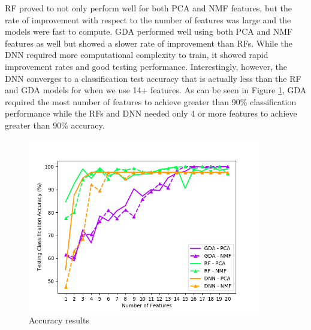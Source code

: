 \documentclass{article}[12pt]
\begin{document}
   RF proved to not only perform well for both PCA and NMF features, but the rate of improvement with respect to the number of features was large and the models were fast to compute. GDA performed well using both PCA and NMF features as well but showed a slower rate of improvement than RFs. While the DNN required more computational complexity to train, it showed rapid improvement rates and good testing performance. Interestingly, however, the DNN converges to a classification test accuracy that is actually less than the RF and GDA models for when we use 14+ features. As can be seen in Figure \ref{fig:accuracyResults}, GDA required the most number of features to achieve greater than 90\% classification performance while the RFs and DNN needed only 4 or more features to achieve greater than 90\% accuracy.
   
    \begin{figure}[!htb]
   	\centering
   	\includegraphics[width=4in]{../plots/fdim_vs_accuracy_all.png}
   	\caption{Accuracy results}
   	\label{fig:accuracyResults}
   \end{figure}
   
\end{document}
